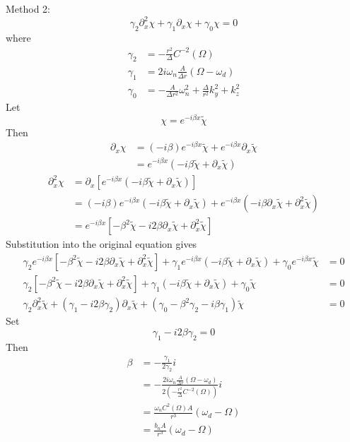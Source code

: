 \documentclass[english]{article}
\begin{document}
Method 2: 
\[
\gamma_{2}\partial^{2}_{x}\chi+\gamma_{1}\partial_{x}\chi+\gamma_{0}\chi=0
\]
 where 
\begin{align*}
\gamma_{2} & =-\frac{r^{2}}{\Delta}C^{-2}\left(\Omega\right)\\
\gamma_{1} & =2i\omega_{n}\frac{A}{\Delta r}\left(\Omega-\omega_{d}\right)\\
\gamma_{0} & =-\frac{A}{\Delta r^{2}}\omega^{2}_{n}+\frac{\Delta}{r^{2}}k^{2}_{y}+k^{2}_{z}
\end{align*}
 Let 
\[
\chi=e^{-i\beta x}\tilde{\chi}
\]
 Then 
\begin{align*}
\partial_{x}\chi & =\left(-i\beta\right)e^{-i\beta x}\tilde{\chi}+e^{-i\beta x}\partial_{x}\tilde{\chi}\\
 & =e^{-i\beta x}\left(-i\beta\tilde{\chi}+\partial_{x}\tilde{\chi}\right)
\end{align*}
 {}
\begin{align*}
\partial^{2}_{x}\chi & =\partial_{x}\left[e^{-i\beta x}\left(-i\beta\tilde{\chi}+\partial_{x}\tilde{\chi}\right)\right]\\
 & =\left(-i\beta\right)e^{-i\beta x}\left(-i\beta\tilde{\chi}+\partial_{x}\tilde{\chi}\right)+e^{-i\beta x}\left(-i\beta\partial_{x}\tilde{\chi}+\partial^{2}_{x}\tilde{\chi}\right)\\
 & =e^{-i\beta x}\left[-\beta^{2}\tilde{\chi}-i2\beta\partial_{x}\tilde{\chi}+\partial^{2}_{x}\tilde{\chi}\right]
\end{align*}
 Substitution into the original equation gives 
\begin{align*}
\gamma_{2}e^{-i\beta x}\left[-\beta^{2}\tilde{\chi}-i2\beta\partial_{x}\tilde{\chi}+\partial^{2}_{x}\tilde{\chi}\right]+\gamma_{1}e^{-i\beta x}\left(-i\beta\tilde{\chi}+\partial_{x}\tilde{\chi}\right)+\gamma_{0}e^{-i\beta x}\tilde{\chi} & =0\\
\gamma_{2}\left[-\beta^{2}\tilde{\chi}-i2\beta\partial_{x}\tilde{\chi}+\partial^{2}_{x}\tilde{\chi}\right]+\gamma_{1}\left(-i\beta\tilde{\chi}+\partial_{x}\tilde{\chi}\right)+\gamma_{0}\tilde{\chi} & =0\\
\gamma_{2}\partial^{2}_{x}\tilde{\chi}+\left(\gamma_{1}-i2\beta\gamma_{2}\right)\partial_{x}\tilde{\chi}+\left(\gamma_{0}-\beta^{2}\gamma_{2}-i\beta\gamma_{1}\right)\tilde{\chi} & =0
\end{align*}
 Set 
\[
\gamma_{1}-i2\beta\gamma_{2}=0
\]
 Then 
\begin{align*}
\beta & =-\frac{\gamma_{1}}{2\gamma_{2}}i\\
 & =-\frac{2i\omega_{n}\frac{A}{\Delta r}\left(\Omega-\omega_{d}\right)}{2\left(-\frac{r^{2}}{\Delta}C^{-2}\left(\Omega\right)\right)}i\\
 & =\frac{\omega_{n}C^{2}\left(\Omega\right)A}{r^{3}}\left(\omega_{d}-\Omega\right)\\
 & =\frac{b_{n}A}{r^{3}}\left(\omega_{d}-\Omega\right)
\end{align*}
\end{document}
